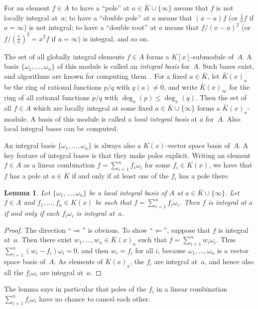 \documentclass{sig-alternate}
\newtheorem{lemma}[theorem]{Lemma}
\begin{document}
For an element $f\in A$ to have a ``pole'' at $a\in\bar K\cup\{\infty\}$ means
that $f$ is not locally integral at~$a$; to have a ``double pole'' at $a$ means
that $(x-a)f$ (or $\frac1xf$ if $a=\infty$) is not integral; to have a ``double
root'' at $a$ means that $f/(x-a)^2$ (or $f/(\frac1x)^2=x^2f$ if $a=\infty$) is integral,
and so on.

The set of all globally integral elements $f\in A$ forms a $K[x]$-submodule of~$A$.
A basis $\{\omega_1,\dots,\omega_n\}$ of this module is called an \emph{integral basis}
for~$A$. Such bases exist, and algorithms are known for computing them~\cite{trager84,vanHoeij94}.
For a fixed $a\in\bar K$, let $\bar K(x)_a$ be the ring of rational functions $p/q$
with $q(a)\neq0$, and write $\bar K(x)_\infty$ for the ring of all
rational functions $p/q$ with $\deg_x(p)\leq\deg_x(q)$.
Then the set of all $f\in A$ which are locally integral at some
fixed $a\in\bar K\cup\{\infty\}$ forms a $\bar K(x)_a$-module. A basis of this module is
called a \emph{local integral basis} at $a$ for~$A$. Also local integral bases can
be computed. 

An integral basis $\{\omega_1,\dots,\omega_n\}$ is always also a $K(x)$-vector space
basis of~$A$. A key feature of integral bases is that they make poles explicit. Writing
an element $f\in A$ as a linear combination $f=\sum_{i=1}^n f_i\omega_i$ for some
$f_i\in K(x)$, we have that $f$ has a pole at $a\in\bar K$ if and only if at least one
of the $f_i$ has a pole there.

\begin{lemma}\label{lemma:1}
  Let $\{\omega_1,\dots,\omega_n\}$ be a local integral basis of $A$ at $a\in\bar K\cup\{\infty\}$.
  Let $f\in A$ and $f_1,\dots,f_n\in K(x)$ be such that $f=\sum_{i=1}^nf_i\omega_i$.
  Then $f$ is integral at $a$ if and only if each $f_i\omega_i$ is integral at~$a$.
\end{lemma}
\begin{proof}
  The direction ``$\Rightarrow$'' is obvious. To show ``$\Leftarrow$'', suppose
  that $f$ is integral at~$a$. Then there exist $w_1,\dots,w_n\in\bar K(x)_a$ such that
  $f=\sum_{i=1}^nw_i\omega_i$. Thus $\sum_{i=1}^n(w_i-f_i)\omega_i=0$, and then
  $w_i=f_i$ for all $i$, because $\omega_1,\dots,\omega_n$ is a vector space basis of~$A$.
  As elements of $\bar K(x)_a$, the $f_i$ are integral at~$a$, and hence also all the $f_i\omega_i$
  are integral at~$a$.
\end{proof}

The lemma says in particular that poles of the $f_i$ in a linear combination
$\sum_{i=1}^n f_i\omega_i$ have no chance to cancel each other.
\end{document}
